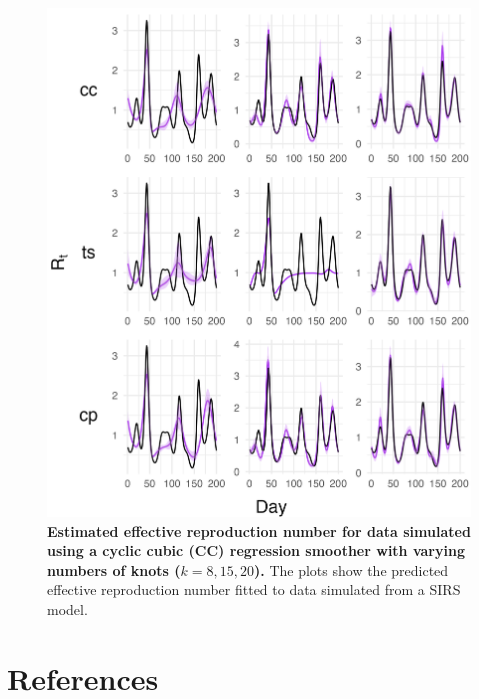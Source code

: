 \documentclass[
11pt, %
oneside, %
english, %
singlespacing, %
]{macthesis} %
\begin{document}
\begin{figure}
\centering
\includegraphics[width=\textwidth]{figure/Simulated/simulation_cc_20_k(8,15,20)_bsd2_beta2_plot_R_t.png}
\caption[Estimated Simulated Data (CC) Effective Reproduction Number]{\textbf{Estimated effective reproduction number for data simulated using a cyclic cubic (CC) regression smoother with varying numbers of knots (\(k = 8, 15, 20\)).} The plots show the predicted effective reproduction number fitted to data simulated from a SIRS model.}
\label{fig:Rt20cc}
\end{figure}

\backmatter

\chapter*{References}\label{references}


\noindent

\setlength{\parindent}{-0.20in}
\setlength{\leftskip}{0.20in}
\setlength{\parskip}{8pt}
\end{document}
